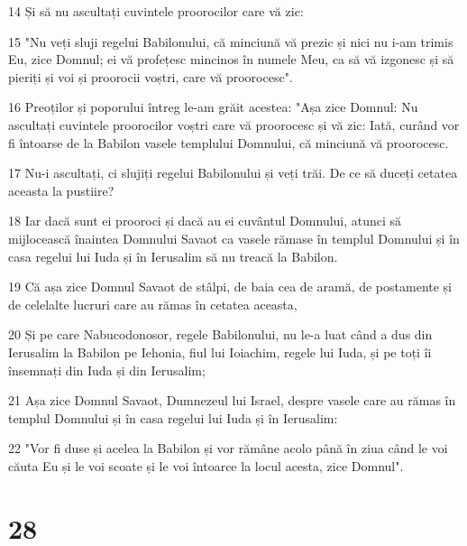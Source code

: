 \par 14 Și să nu ascultați cuvintele proorocilor care vă zic:
\par 15 "Nu veți sluji regelui Babilonului, că minciună vă prezic și nici nu i-am trimis Eu, zice Domnul; ei vă profețesc mincinos în numele Meu, ca să vă izgonesc și să pieriți și voi și proorocii voștri, care vă proorocesc".
\par 16 Preoților și poporului întreg le-am grăit acestea: "Așa zice Domnul: Nu ascultați cuvintele proorocilor voștri care vă proorocesc și vă zic: Iată, curând vor fi întoarse de la Babilon vasele templului Domnului, că minciună vă proorocesc.
\par 17 Nu-i ascultați, ci slujiți regelui Babilonului și veți trăi. De ce să duceți cetatea aceasta la pustiire?
\par 18 Iar dacă sunt ei prooroci și dacă au ei cuvântul Domnului, atunci să mijlocească înaintea Domnului Savaot ca vasele rămase în templul Domnului și în casa regelui lui Iuda și în Ierusalim să nu treacă la Babilon.
\par 19 Că așa zice Domnul Savaot de stâlpi, de baia cea de aramă, de postamente și de celelalte lucruri care au rămas în cetatea aceasta,
\par 20 Și pe care Nabucodonosor, regele Babilonului, nu le-a luat când a dus din Ierusalim la Babilon pe Iehonia, fiul lui Ioiachim, regele lui Iuda, și pe toți îi însemnați din Iuda și din Ierusalim;
\par 21 Așa zice Domnul Savaot, Dumnezeul lui Israel, despre vasele care au rămas în templul Domnului și în casa regelui lui Iuda și în Ierusalim:
\par 22 "Vor fi duse și acelea la Babilon și vor rămâne acolo până în ziua când le voi căuta Eu și le voi scoate și le voi întoarce la locul acesta, zice Domnul".

\chapter{28}


